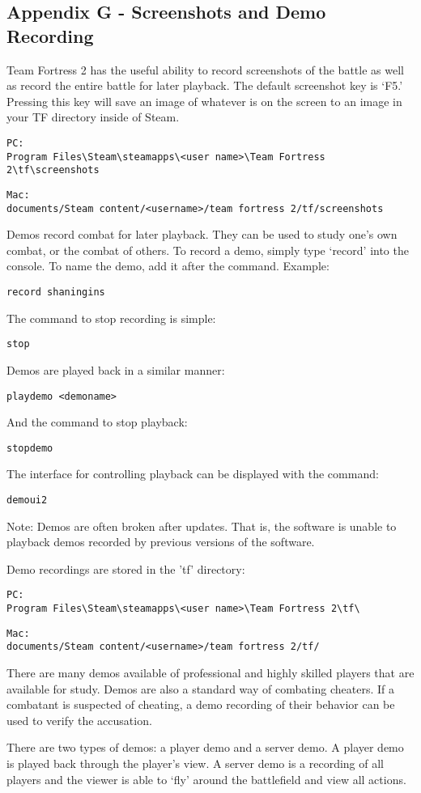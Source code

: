\subsection{Appendix G - Screenshots and Demo Recording}

Team Fortress 2 has the useful ability to record screenshots of the battle as well as record the entire battle for later playback.  The default screenshot key is `F5.'  Pressing this key will save an image of whatever is on the screen to an image in your TF directory inside of Steam.
\begin{lstlisting}
PC: 
Program Files\Steam\steamapps\<user name>\Team Fortress 2\tf\screenshots
\end{lstlisting}
\begin{lstlisting}
Mac: 
documents/Steam content/<username>/team fortress 2/tf/screenshots
\end{lstlisting}
Demos record combat for later playback.  They can be used to study one's own combat, or the combat of others.  To record a demo, simply type `record' into the console.  To name the demo, add it after the command.  Example:
\begin{lstlisting}
record shaningins
\end{lstlisting}
The command to stop recording is simple:
\begin{lstlisting}
stop
\end{lstlisting}
Demos are played back in a similar manner:
\begin{lstlisting}
playdemo <demoname>
\end{lstlisting}
And the command to stop playback:
\begin{lstlisting}
stopdemo
\end{lstlisting}

The interface for controlling playback can be displayed with the command:
\begin{lstlisting}
demoui2
\end{lstlisting}

Note:  Demos are often broken after updates.  That is, the software is unable to playback demos recorded by previous versions of the software.

Demo recordings are stored in the 'tf' directory:
\begin{lstlisting}
PC: 
Program Files\Steam\steamapps\<user name>\Team Fortress 2\tf\
\end{lstlisting}

\begin{lstlisting}
Mac: 
documents/Steam content/<username>/team fortress 2/tf/
\end{lstlisting}

There are many demos available of professional and highly skilled players that are available for study.  Demos are also a standard way of combating cheaters.  If a combatant is suspected of cheating, a demo recording of their behavior can be used to verify the accusation.

There are two types of demos: a player demo and a server demo.  A player demo is played back through the player's view.  A server demo is a recording of all players and the viewer is able to `fly' around the battlefield and view all actions.